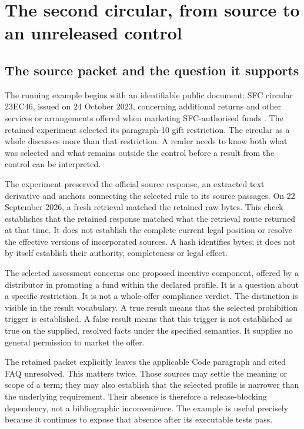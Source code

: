 \chapter{The second circular, from source to an unreleased control}
\label{ch:circular}

\section{The source packet and the question it supports}
\label{sec:circular-packet}
The running example begins with an identifiable public document: SFC circular
23EC46, issued on 24 October 2023, concerning additional returns and other
services or arrangements offered when marketing SFC-authorised funds
\citep{sfcmarketing}. The retained experiment selected its paragraph-10 gift
restriction. The circular as a whole discusses more than that restriction. A
reader needs to know both what was selected and what remains outside the control
before a result from the control can be interpreted.

The experiment preserved the official source response, an extracted text
derivative and anchors connecting the selected rule to its source passages.
On 22 September 2026, a fresh retrieval matched the retained raw bytes. This
check establishes that the retained response matched what the retrieval route
returned at that time. It does not establish the complete current legal position
or resolve the effective versions of incorporated sources. A hash identifies
bytes; it does not by itself establish their authority, completeness or legal
effect.

The selected assessment concerns one proposed incentive component, offered by a
distributor in promoting a fund within the declared profile. It is a question
about a specific restriction. It is not a whole-offer compliance verdict. The
distinction is visible in the result vocabulary. A true result means that the
selected prohibition trigger is established. A false result means that this
trigger is not established as true on the supplied, resolved facts under the
specified semantics. It supplies no general permission to market the offer.

The retained packet explicitly leaves the applicable Code paragraph and cited
FAQ unresolved. This matters twice. Those sources may settle the meaning or
scope of a term; they may also establish that the selected profile is narrower
than the underlying requirement. Their absence is therefore a release-blocking
dependency, not a bibliographic inconvenience. The example is useful precisely
because it continues to expose that absence after its executable tests pass.

